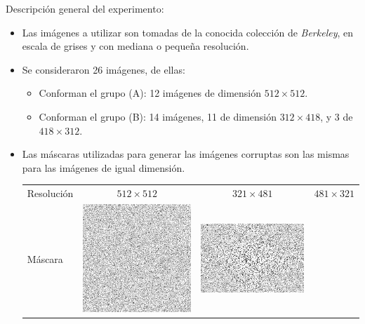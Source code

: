 Descripci\'on general del experimento:
\begin{itemize}
	\item Las im\'agenes a utilizar son tomadas de la conocida colecci\'on de \textit{Berkeley}, en escala de grises y con mediana o pequeña resoluci\'on.
	\item Se consideraron 26 im\'agenes, de ellas:
	\begin{itemize}
		\item Conforman el grupo (A): 12 im\'agenes de dimensi\'on $512 \times 512$.
		\item Conforman el grupo (B): 14 im\'agenes, 11 de dimensi\'on $312 \times 418$, y 3 de $418 \times 312$.
	\end{itemize}
	\item Las m\'ascaras utilizadas para generar las im\'agenes corruptas son las mismas para las im\'agenes de igual dimensión.
	\begin{table}[H]
		\centering
		\begin{tabular}{|l|ccc|}\hline
		Resoluci\'on & $512 \times 512$ & $321 \times 481$ & $481 \times 321$ \\
		M\'ascara &
		\includegraphics[scale=0.2]{Experiments/Berkeley/mask_512_512.tif} &
		\includegraphics[scale=0.2]{Experiments/Berkeley/mask_481_321.jpg} &

\end{tabular}
\end{table}
\end{itemize}
